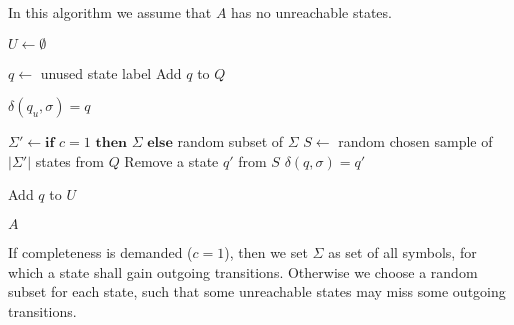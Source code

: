 In this algorithm we assume that $A$ has no unreachable states.
\vspace{0.2cm}
\begin{algorithmic}[1]
	\State $U \gets \emptyset$ 
	\vspace{0.2cm}
	
	\vspace{0.2cm}
	
		\State $q \gets$ unused state label
		\State Add $q$ to $Q$
		\vspace{0.2cm}
		
		 
			\State $\delta(q_u, \sigma) = q$
		\EndFor
		\vspace{0.2cm}
		
        \State $\Sigma' \gets \textbf{if } c = 1 \textbf{ then } \Sigma \textbf{ else}$ random subset of $\Sigma$ 
		\State $S \gets$ random chosen sample of $|\Sigma'|$ states from $Q$
			\State Remove a state $q'$ from $S$
			\State $\delta(q, \sigma) = q'$
		\EndFor
		\vspace{0.2cm}
		
		\State Add $q$ to $U$
	\EndFor
	\vspace{0.2cm}
	
	\State \Return $A$
	\EndFunction
\end{algorithmic}
\vspace{0.2cm}
If completeness is demanded ($c=1$), then we set $\Sigma$ as set of all symbols, for which a state shall gain outgoing transitions. Otherwise we choose a random subset for each state, such that some unreachable states may miss some outgoing transitions.
